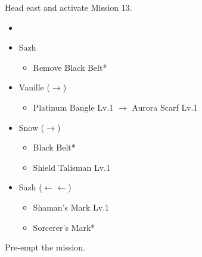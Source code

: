 Head east and activate Mission 13.

\begin{menu}
	\begin{itemize}
		\paradigm
		\begin{itemize}
			\item {}%
				  {\paradigmline{\syn}{(\sab)}{\com}}%
			      {\paradigmline{\rav}{(\sab)}{(\sen)}}%
			      {\paradigmline[4]{\syn}{\med}{(\sen)}}%
			      {\paradigmline{(\com)}{(\med)}{(\sen)}}%
			      {\paradigmline{\com}{\rav}{\com}}%
			      {\paradigmline{(\com)}{(\sab)}{(\sen)}}
		\end{itemize}
		\equip
		\begin{itemize}
			\item Sazh
				\begin{itemize}
					\item Remove Black Belt*
				\end{itemize}
			\item Vanille ($\rightarrow$)
				\begin{itemize}
					\item Platinum Bangle Lv.1 $\rightarrow$ Aurora Scarf Lv.1
				\end{itemize}
			\item Snow ($\rightarrow$)
			      \begin{itemize}
				      \item Black Belt*
				      \item Shield Talisman Lv.1
			      \end{itemize}
			\item Sazh ($\leftarrow\leftarrow$)
			      \begin{itemize}
				      \item Shaman's Mark Lv.1
				      \item Sorcerer's Mark*
			      \end{itemize}
		\end{itemize}
	\end{itemize}
\end{menu}

\renewcommand{\first}{[1] Bully (\syn/\sab/\com)}
\renewcommand{\second}{[2] Matador (\rav/\sab/\sen)}
\renewcommand{\third}{[3] Protection (\syn/\med/\sen)}
\renewcommand{\fourth}{[4] Solidarity (\com/\med/\sen)}
\renewcommand{\sixth}{[6] Dirty Fighting (\com/\sab/\sen)}

Pre-empt the mission.

